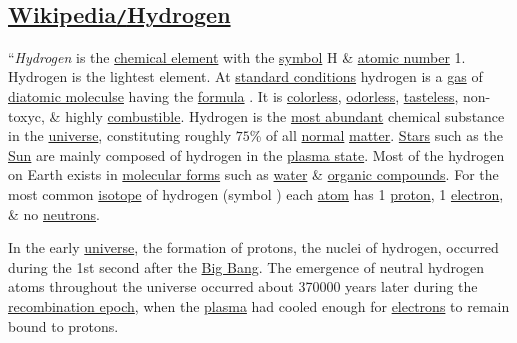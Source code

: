 \documentclass{article}
\begin{document}
\subsection{\href{https://en.wikipedia.org/wiki/Hydrogen}{Wikipedia\texttt{/}Hydrogen}}
``\textit{Hydrogen} is the \href{https://en.wikipedia.org/wiki/Chemical_element}{chemical element} with the \href{https://en.wikipedia.org/wiki/Symbol_(chemistry)}{symbol} H \& \href{https://en.wikipedia.org/wiki/Atomic_number}{atomic number} 1. Hydrogen is the lightest element. At \href{https://en.wikipedia.org/wiki/Standard_temperature_and_pressure}{standard conditions} hydrogen is a \href{https://en.wikipedia.org/wiki/Gas}{gas} of \href{https://en.wikipedia.org/wiki/Diatomic_molecule}{diatomic moleculse} having the \href{https://en.wikipedia.org/wiki/Chemical_formula}{formula} . It is \href{https://en.wikipedia.org/wiki/Transparency_(optics)}{colorless}, \href{https://en.wikipedia.org/wiki/Sense_of_smell}{odorless}, \href{https://en.wikipedia.org/wiki/Taste}{tasteless}, non-toxyc, \& highly \href{https://en.wikipedia.org/wiki/Combustible}{combustible}. Hydrogen is the \href{https://en.wikipedia.org/wiki/Abundance_of_the_chemical_elements}{most abundant} chemical substance in the \href{https://en.wikipedia.org/wiki/Universe}{universe}, constituting roughly $75$\% of all \href{https://en.wikipedia.org/wiki/Baryon}{normal} \href{https://en.wikipedia.org/wiki/Matter}{matter}. \href{https://en.wikipedia.org/wiki/Star}{Stars} such as the \href{https://en.wikipedia.org/wiki/Sun}{Sun} are mainly composed of hydrogen in the \href{https://en.wikipedia.org/wiki/Plasma_state}{plasma state}. Most of the hydrogen on Earth exists in \href{https://en.wikipedia.org/wiki/Molecular_geometry}{molecular forms} such as \href{https://en.wikipedia.org/wiki/Water}{water} \& \href{https://en.wikipedia.org/wiki/Organic_compound}{organic compounds}. For the most common \href{https://en.wikipedia.org/wiki/Isotope}{isotope} of hydrogen (symbol ) each \href{https://en.wikipedia.org/wiki/Atom}{atom} has 1 \href{https://en.wikipedia.org/wiki/Proton}{proton}, 1 \href{https://en.wikipedia.org/wiki/Electron}{electron}, \& no \href{https://en.wikipedia.org/wiki/Neutron}{neutrons}.

In the early \href{https://en.wikipedia.org/wiki/Universe}{universe}, the formation of protons, the nuclei of hydrogen, occurred during the 1st second after the \href{https://en.wikipedia.org/wiki/Big_Bang}{Big Bang}. The emergence of neutral hydrogen atoms throughout the universe occurred about 370000 years later during the \href{https://en.wikipedia.org/wiki/Recombination_(cosmology)}{recombination epoch}, when the \href{https://en.wikipedia.org/wiki/Plasma_(physics)}{plasma} had cooled enough for \href{https://en.wikipedia.org/wiki/Electrons}{electrons} to remain bound to protons.
\end{document}
